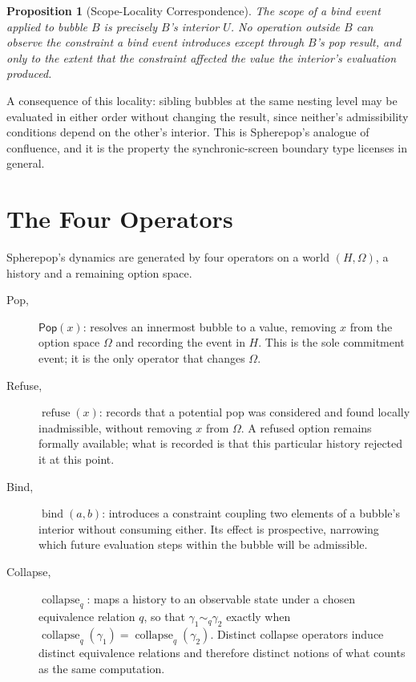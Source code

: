 \documentclass[11pt,fleqn]{book}
\numberwithin{equation}{chapter}
\theoremstyle{plain}
\newtheorem{proposition}[theorem]{Proposition}
\theoremstyle{definition}
\theoremstyle{remark}
\providecommand{\scollapse}[1]{\operatorname{collapse}_{#1}}
\providecommand{\srefuse}[1]{\operatorname{refuse}(#1)}
\providecommand{\sbind}[2]{\operatorname{bind}(#1,#2)}
\providecommand{\Pop}{\mathsf{Pop}}
\begin{document}
\begin{proposition}[Scope-Locality Correspondence]
The scope of a bind event applied to bubble \(B\) is precisely \(B\)'s interior \(U\). No operation outside \(B\) can observe the constraint a bind event introduces except through \(B\)'s pop result, and only to the extent that the constraint affected the value the interior's evaluation produced.
\end{proposition}

A consequence of this locality: sibling bubbles at the same nesting level may be evaluated in either order without changing the result, since neither's admissibility conditions depend on the other's interior. This is Spherepop's analogue of confluence, and it is the property the synchronic-screen boundary type licenses in general.

\section{The Four Operators}

Spherepop's dynamics are generated by four operators on a world \((H,\Omega)\), a history and a remaining option space.

\begin{description}
\item[Pop,] \(\Pop(x)\): resolves an innermost bubble to a value, removing \(x\) from the option space \(\Omega\) and recording the event in \(H\). This is the sole commitment event; it is the only operator that changes \(\Omega\).
\item[Refuse,] \(\srefuse{x}\): records that a potential pop was considered and found locally inadmissible, without removing \(x\) from \(\Omega\). A refused option remains formally available; what is recorded is that this particular history rejected it at this point.
\item[Bind,] \(\sbind{a}{b}\): introduces a constraint coupling two elements of a bubble's interior without consuming either. Its effect is prospective, narrowing which future evaluation steps within the bubble will be admissible.
\item[Collapse,] \(\scollapse{q}\): maps a history to an observable state under a chosen equivalence relation \(q\), so that \(\gamma_1\sim_q\gamma_2\) exactly when \(\scollapse{q}(\gamma_1)=\scollapse{q}(\gamma_2)\). Distinct collapse operators induce distinct equivalence relations and therefore distinct notions of what counts as the same computation.
\end{description}
\end{document}
